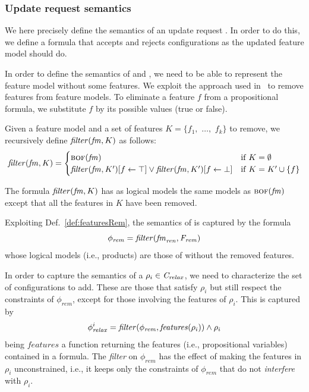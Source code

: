 \begin{tikzborder}{\cite{Gargantini16:validation}}
\begin{tikzborder}{\cite{gargantini_combinatorial_2017}}
\begin{tikzborder}{\cite{gargantini_combinatorial_2017}}
\begin{tikzborder}{\cite{garn2019}}
\begin{tikzborder}{\cite{arcaini2019achieving}}
	\subsubsection{Update request semantics}\label{sec:target}
	
	\bb We here precisely define the semantics of an update request \UR. In order to do this, we define a formula that accepts and rejects configurations as the updated feature model should do.
	
	In order to define the semantics of \Frem and \CFrelax, we need to be able to represent the feature model without some features. We exploit the approach used in~\cite{thum_abstract_2011} to remove features from feature models. To eliminate a feature $f$ from a propositional formula, we substitute $f$ by its possible values (true or false). \be
	
	\begin{mydef}\label{def:featuresRem}
		\bb Given a feature model \fm and a set of features $K = \{f_1,$ $\ldots,$ $f_k\}$ to remove, we recursively define $\mathit{filter}(\mathit{fm}, K)$ as follows:\be
		\begin{equation*}
		\mathit{filter}(\mathit{fm}, K) =\begin{cases}
		\textsc{bof}(\mathit{fm}) & {\rm if} \; K = \emptyset\\
		\mathit{filter}(\mathit{fm}, K^\prime)[f \leftarrow \top] \vee \mathit{filter}(\mathit{fm}, K^\prime)[f \leftarrow \bot] & {\rm if} \; K = K^\prime \cup \{f\}\\
		\end{cases}
		\end{equation*}
	\end{mydef}
	
	\bb The formula $\mathit{filter}(\mathit{fm}, K)$ has as logical models the same models as $\textsc{bof}(\mathit{fm})$ except that all the features in $K$ have been removed.
	
	Exploiting Def.~\ref{def:featuresRem}, the semantics of \Frem is captured by the formula
	\[\phi_{\mathit{rem}} = \mathit{filter}(\mathit{fm}_{\mathit{ren}}, \mathit{F_{rem}})\] 
	whose logical models (i.e., products) are those of \fmrenamed without the removed features.
	
	In order to capture the semantics of a $\rho_i \in \mathit{C_{relax}}$, we need to characterize the set of configurations to add. These are those that satisfy $\rho_i$ but still respect the constraints of $\phi_{\mathit{rem}}$, except for those involving the features of $\rho_i$. This is captured by
	\[\phi^i_{\mathit{relax}} = \mathit{filter}(\phi_{\mathit{rem}}, \mathit{features}(\rho_i)) \wedge \rho_i\]
	being $\mathit{features}$ a function returning the features (i.e., propositional variables) contained in a formula. The {\it filter} on $\phi_{\mathit{rem}}$ has the effect of making the features in $\rho_i$ unconstrained, i.e., it keeps only the constraints of $\phi_{\mathit{rem}}$ that do not {\it interfere} with $\rho_i$.
	

\end{tikzborder}
\end{tikzborder}
\end{tikzborder}
\end{tikzborder}
\end{tikzborder}
